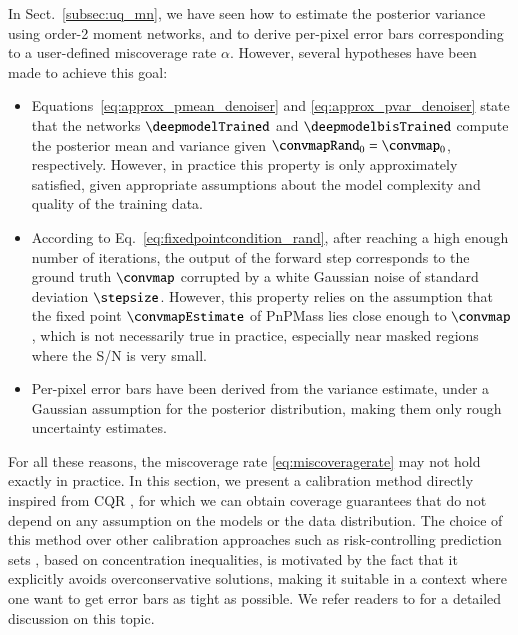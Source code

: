 \documentclass{aa}
\begin{document}
In Sect.~\ref{subsec:uq_mn}, we have seen how to estimate the posterior variance using order-2 moment networks, and to derive per-pixel error bars corresponding to a user-defined miscoverage rate $\alpha$. However, several hypotheses have been made to achieve this goal:
\begin{itemize}
    \item[--] Equations~\eqref{eq:approx_pmean_denoiser} and \eqref{eq:approx_pvar_denoiser} state that the networks $\deepmodelTrained$ and $\deepmodelbisTrained$ compute the posterior mean and variance given $\convmapRand_0 = \convmap_0$, respectively. However, in practice this property is only approximately satisfied, given appropriate assumptions about the model complexity and quality of the training data.
    \item[--] According to Eq.~\eqref{eq:fixedpointcondition_rand}, after reaching a high enough number of iterations, the output of the forward step corresponds to the ground truth $\convmap$ corrupted by a white Gaussian noise of standard deviation $\stepsize$. However, this property relies on the assumption that the fixed point $\convmapEstimate$ of PnPMass lies close enough to $\convmap$, which is not necessarily true in practice, especially near masked regions where the S/N is very small.
    \item[--] Per-pixel error bars have been derived from the variance estimate, under a Gaussian assumption for the posterior distribution, making them only rough uncertainty estimates.
\end{itemize}

For all these reasons, the miscoverage rate \eqref{eq:miscoveragerate} may not hold exactly in practice. In this section, we present a calibration method directly inspired from CQR \citep{Romano2019}, for which we can obtain coverage guarantees that do not depend on any assumption on the models or the data distribution. The choice of this method over other calibration approaches such as risk-controlling prediction sets \citep{Angelopoulos2022c}, based on concentration inequalities, is motivated by the fact that it explicitly avoids overconservative solutions, making it suitable in a context where one want to get error bars as tight as possible. We refer readers to \citet{LetermeDistributionfreeUncertainty2025} for a detailed discussion on this topic.
\end{document}
